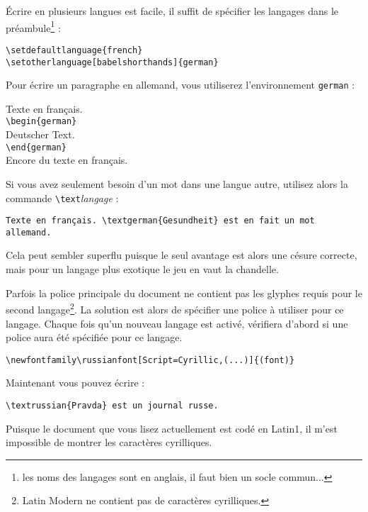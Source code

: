 Écrire en plusieurs langues est facile, il suffit de spécifier les
langages dans le préambule\footnote{les noms des langages sont en
  anglais, il faut bien un socle commun... \NdT} :

\begin{lscommand}
\verb|\setdefaultlanguage{french}|\\
\verb|\setotherlanguage[babelshorthands]{german}|
\end{lscommand}
%
Pour écrire un paragraphe en allemand, vous utiliserez l'environnement
\texttt{german} :

\begin{lscommand}
Texte en français.\\
\verb|\begin{german}|\\
Deutscher Text.\\
\verb|\end{german}|\\
Encore du texte en français.
\end{lscommand}

Si vous avez seulement besoin d'un mot dans une langue autre, utilisez
alors la commande \verb|\text|\emph{langage} :

\begin{lscommand}
\verb|Texte en français. \textgerman{Gesundheit} est en fait un mot allemand.|
\end{lscommand}

Cela peut sembler superflu puisque le seul avantage est alors une
césure correcte, mais pour un langage plus exotique le jeu en vaut la
chandelle.

Parfois la police principale du document ne contient pas les glyphes
requis pour le second langage\footnote{Latin Modern ne contient pas de
  caractères cyrilliques.}. La solution est alors de spécifier une
police à utiliser pour ce langage. Chaque fois qu'un nouveau langage
est activé,  vérifiera d'abord si une police aura été
spécifiée pour ce langage.

\begin{lscommand}
\verb|\newfontfamily\russianfont[Script=Cyrillic,(...)]{(font)}|
\end{lscommand}

Maintenant vous pouvez écrire :

\begin{lscommand} \verb|\textrussian{Pravda} est un journal russe.|
\end{lscommand}
%
Puisque le document que vous lisez actuellement est codé en Latin1, il
m'est impossible de montrer les caractères
cyrilliques.

